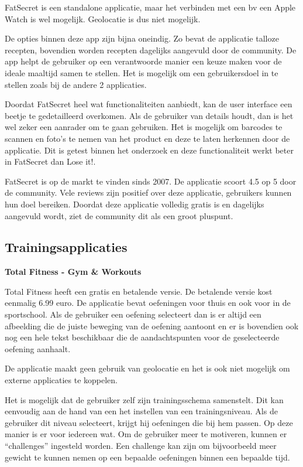 FatSecret is een standalone applicatie, maar het verbinden met een bv een Apple Watch is wel mogelijk. Geolocatie is dus niet mogelijk.

De opties binnen deze app zijn bijna oneindig. Zo bevat de applicatie talloze recepten, bovendien worden recepten dagelijks aangevuld door de community. De app helpt de gebruiker op een verantwoorde manier een keuze maken voor de ideale maaltijd samen te stellen.  Het is mogelijk om een gebruikersdoel in te stellen zoals bij de andere 2 applicaties.

Doordat FatSecret heel wat functionaliteiten aanbiedt, kan de user interface een beetje te gedetailleerd overkomen. Als de gebruiker van details houdt, dan is het wel zeker een aanrader om te gaan gebruiken. Het is mogelijk om barcodes te scannen en foto’s te nemen van het product en deze te laten herkennen door de applicatie. Dit is getest binnen het onderzoek en deze functionaliteit werkt beter in FatSecret dan Lose it!.

FatSecret is op de markt te vinden sinds 2007. De applicatie scoort 4.5 op 5 door de community. Vele reviews zijn positief over deze applicatie, gebruikers kunnen hun doel bereiken. Doordat deze applicatie volledig gratis is en dagelijks aangevuld wordt, ziet de community dit als een groot pluspunt.

\newpage
\subsection{Trainingsapplicaties}

\textbf{Total Fitness - Gym \& Workouts}

Total Fitness heeft een gratis en betalende versie. De betalende versie kost eenmalig 6.99 euro.  De applicatie bevat oefeningen voor thuis en ook voor in de sportschool. Als de gebruiker een oefening selecteert dan is er altijd een afbeelding die de juiste beweging van de oefening aantoont en er is bovendien ook nog een hele tekst beschikbaar die de aandachtspunten voor de geselecteerde oefening aanhaalt. 

De applicatie maakt geen gebruik van geolocatie en het is ook niet mogelijk om externe applicaties te koppelen. 

Het is mogelijk dat de gebruiker zelf zijn trainingsschema samenstelt. Dit kan eenvoudig aan de hand van een het instellen van een trainingsniveau. Als de gebruiker dit niveau selecteert, krijgt hij oefeningen die bij hem passen. Op deze manier is er voor iedereen wat. Om de gebruiker meer te motiveren, kunnen er “challenges” ingesteld worden. Een challenge kan zijn om bijvoorbeeld meer gewicht te kunnen nemen op een bepaalde oefeningen binnen een bepaalde tijd. 

